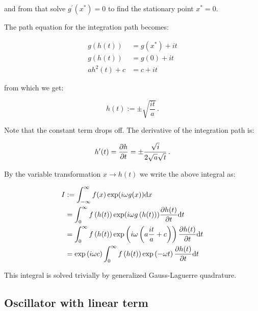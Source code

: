 \documentclass[a4paper,10pt]{article}
\begin{document}
and from that solve $g^\prime(x^{*}) = 0$ to find the stationary point $x^{*} = 0$.

The path equation for the integration path becomes:

\begin{equation}
\begin{split}
  g\left( h(t) \right) & = g(x^{*}) + i t \\
  g\left( h(t) \right) & = g(0) + i t \\
  a h^2(t) + c         & = c +  it
\end{split}
\end{equation}

from which we get:

\begin{equation}
 h(t) := \pm \sqrt{\frac{i t}{a}} \,.
\end{equation}

Note that the constant term drops off.
The derivative of the integration path is:

\begin{equation}
 h^{\prime}(t) = \frac{\partial h}{\partial t} = \pm \frac{\sqrt{i}}{2\sqrt{a}\sqrt{t}} \,.
\end{equation}

By the variable transformation $x \rightarrow h(t)$ we write the above
integral as:

\begin{equation}
\begin{split}
 I & := \int_{-\infty}^{\infty} f(x) \exp(i \omega g(x)) \mathrm{d}x \\
   &  = \int_{0}^{\infty} f\left(h(t)\right) \exp(i \omega g\left(h(t)\right)) \frac{\partial h(t)}{\partial t} \mathrm{d}t \\
   &  = \int_{0}^{\infty} f\left(h(t)\right) \exp\left(i \omega \left(a\frac{i t}{a}+c\right)\right) \frac{\partial h(t)}{\partial t} \mathrm{d}t \\
   &  = \exp\left(i \omega c\right)
        \int_{0}^{\infty} f\left(h(t)\right) \exp\left(-\omega t\right) \frac{\partial h(t)}{\partial t} \mathrm{d}t
\end{split}
\end{equation}

This integral is solved trivially by generalized Gauss-Laguerre quadrature.


\subsection{Oscillator with linear term}
\label{sec:scal_full}
\end{document}
